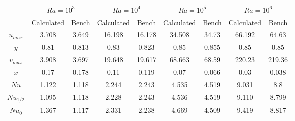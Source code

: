 \begin{table}[h]
	\centering
	\begin{tabular}{c|c|c|c|c|c|c|c|c|}
		\cline{2-9}
		\multicolumn{1}{l|}{}       & \multicolumn{2}{c|}{$Ra=10^{3}$} & \multicolumn{2}{c|}{$Ra=10^{4}$} & \multicolumn{2}{c|}{$Ra=10^{5}$} & \multicolumn{2}{c|}{$Ra=10^{6}$} \\ \cline{2-9} 
		\multicolumn{1}{l|}{}       & Calculated                & Bench                & Calculated                & Bench                & Calculated                & Bench                & Calculated                & Bench                \\ \hline
		\multicolumn{1}{|c|}{$u_{max}$}  & 3.708                   & 3.649                & 16.198                   & 16.178               & 34.508                   & 34.73                & 66.192                   & 64.63                \\ \hline
		\multicolumn{1}{|c|}{$y$}     & 0.81                      & 0.813                & 0.83                      & 0.823                & 0.85                      & 0.855                & 0.85                      & 0.85                 \\ \hline
		\multicolumn{1}{|c|}{$v_{max}$}  & 3.908                    & 3.697                & 19.648                   & 19.617               & 68.663                    & 68.59                & 220.23                    & 219.36               \\ \hline
		\multicolumn{1}{|c|}{$x$}     & 0.17                      & 0.178                & 0.11                      & 0.119                & 0.07                      & 0.066                & 0.03                      & 0.038               \\ \hline
		\multicolumn{1}{|c|}{$\overbar{Nu}$} & 1.122                     & 1.118                & 2.244                   & 2.243                & 4.535                   & 4.519                & 9.031                   & 8.8                  \\ \hline
		\multicolumn{1}{|c|}{$Nu_{1/2}$}  & 1.095                   & 1.118                & 2.228                   & 2.243                & 4.536                   & 4.519                & 9.110                   & 8.799                \\ \hline
		\multicolumn{1}{|c|}{$Nu_{0}$}   & 1.367                   & 1.117                & 2.331                   & 2.238                & 4.669                   & 4.509                & 9.419                   & 8.817                \\ \hline

\end{tabular}
\end{table}
